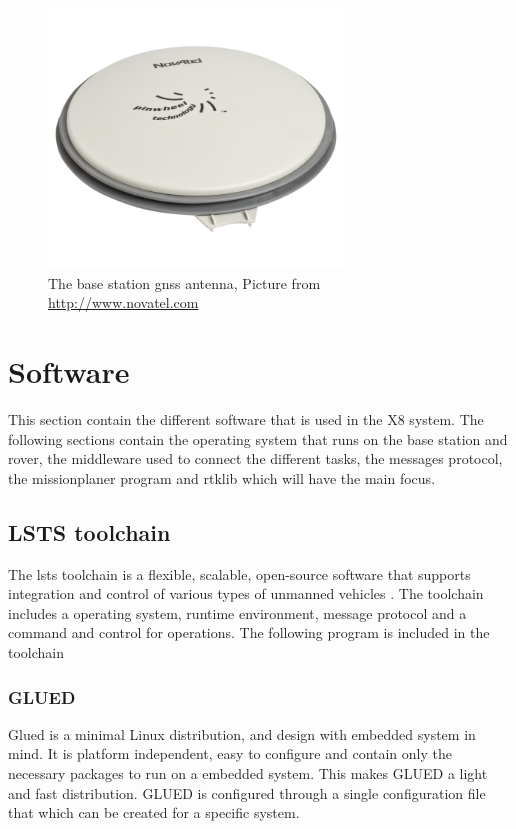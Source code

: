 \begin{figure}[H]
	\centering
		\includegraphics[width=0.7\textwidth]{figs/702-L.png}
		\caption{The base station \gls{gnss} antenna, Picture from \url{http://www.novatel.com}}
		\label{figure:Novatel}
\end{figure}


\section{Software}\label{S:software}
This section contain the different software that is used in the X8 system. The following sections contain the operating system that runs on the base station and rover, the middleware used to connect the different tasks, the messages protocol, the missionplaner program and rtklib which will have the main focus.
\subsection{LSTS toolchain}
The \acrfull{lsts} toolchain is a flexible, scalable, open-source software that supports integration and control of various types of unmanned vehicles \citep{pinto2013lsts}. The toolchain includes a operating system, runtime environment, message protocol and a command and control for operations. The following program is included in the toolchain
\subsubsection{GLUED}
Glued is a minimal Linux distribution, and design with embedded system in mind. It is platform independent, easy to configure and contain only the necessary packages to run on a embedded system. This makes GLUED a light and fast distribution. GLUED is configured through a single configuration file that which can be created for a specific system. 
